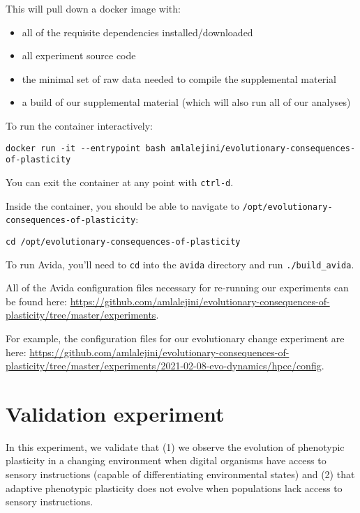 \documentclass[]{book}
\providecommand{\tightlist}{%
  \setlength{\itemsep}{0pt}\setlength{\parskip}{0pt}}
\begin{document}
This will pull down a docker image with:

\begin{itemize}
\tightlist
\item
  all of the requisite dependencies installed/downloaded
\item
  all experiment source code
\item
  the minimal set of raw data needed to compile the supplemental material
\item
  a build of our supplemental material (which will also run all of our analyses)
\end{itemize}

To run the container interactively:

\begin{verbatim}
docker run -it --entrypoint bash amlalejini/evolutionary-consequences-of-plasticity
\end{verbatim}

You can exit the container at any point with \texttt{ctrl-d}.

Inside the container, you should be able to navigate to \texttt{/opt/evolutionary-consequences-of-plasticity}:

\begin{verbatim}
cd /opt/evolutionary-consequences-of-plasticity
\end{verbatim}

To run Avida, you'll need to \texttt{cd} into the \texttt{avida} directory and run \texttt{./build\_avida}.

All of the Avida configuration files necessary for re-running our experiments can be found here: \url{https://github.com/amlalejini/evolutionary-consequences-of-plasticity/tree/master/experiments}.

For example, the configuration files for our evolutionary change experiment are here: \url{https://github.com/amlalejini/evolutionary-consequences-of-plasticity/tree/master/experiments/2021-02-08-evo-dynamics/hpcc/config}.

\hypertarget{validation-experiment}{%
\chapter{Validation experiment}\label{validation-experiment}}

In this experiment, we validate that
(1) we observe the evolution of phenotypic plasticity in a changing environment when digital organisms have access to sensory instructions (capable of differentiating environmental states)
and (2) that adaptive phenotypic plasticity does not evolve when populations lack access to sensory instructions.
\end{document}
